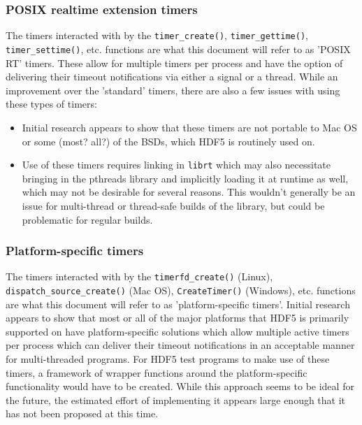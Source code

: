 \documentclass[../HDF5_RFC.tex]{subfiles}
\begin{document}
\subsubsection{POSIX realtime extension timers}

The timers interacted with by the \texttt{timer\_create()}, \texttt{timer\_gettime()},
\texttt{timer\_settime()}, etc. functions are what this document will refer to as 'POSIX RT' timers.
These allow for multiple timers per process and have the option of delivering their timeout notifications
via either a signal or a thread. While an improvement over the 'standard' timers, there are also a few
issues with using these types of timers:

\begin{itemize}
    \item Initial research appears to show that these timers are not portable to Mac OS or some (most? all?)
          of the BSDs, which HDF5 is routinely used on.
    \item Use of these timers requires linking in \texttt{librt} which may also necessitate bringing in
          the pthreads library and implicitly loading it at runtime as well, which may not be desirable
          for several reasons. This wouldn't generally be an issue for multi-thread or thread-safe
          builds of the library, but could be problematic for regular builds.
\end{itemize}

\subsubsection{Platform-specific timers}

The timers interacted with by the \texttt{timerfd\_create()} (Linux), \texttt{dispatch\_source\_create()} (Mac OS), \texttt{CreateTimer()} (Windows), etc. functions are what this document will refer to as 'platform-specific timers'. Initial research appears to show that most or all of the major platforms that HDF5 is
primarily supported on have platform-specific solutions which allow multiple active timers per process
which can deliver their timeout notifications in an acceptable manner for multi-threaded programs. For HDF5
test programs to make use of these timers, a framework of wrapper functions around the platform-specific functionality would have to be created. While this approach seems to be ideal for the future, the estimated
effort of implementing it appears large enough that it has not been proposed at this time.
\end{document}
